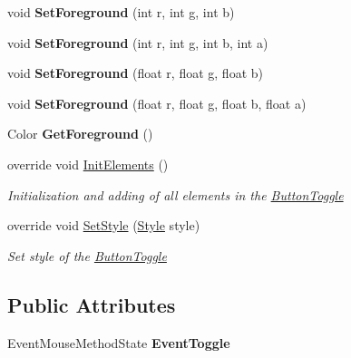 \begin{DoxyCompactItemize}
\mbox{\label{class_space_v_i_l_1_1_button_toggle_acbe7c5a48745ee961ec69cc8b9ed1fac}} 
void {\bfseries Set\+Foreground} (int r, int g, int b)
\item 
\mbox{\label{class_space_v_i_l_1_1_button_toggle_a734ebe430259a68d7a6ec1757d28e6de}} 
void {\bfseries Set\+Foreground} (int r, int g, int b, int a)
\item 
\mbox{\label{class_space_v_i_l_1_1_button_toggle_acddc6b624b12c5ea3cd2bb2970eda391}} 
void {\bfseries Set\+Foreground} (float r, float g, float b)
\item 
\mbox{\label{class_space_v_i_l_1_1_button_toggle_ab725dbd06795c980e9765c2a2d2ca1b3}} 
void {\bfseries Set\+Foreground} (float r, float g, float b, float a)
\item 
\mbox{\label{class_space_v_i_l_1_1_button_toggle_a5e2723658f35d5d0777d3dc082f5256e}} 
Color {\bfseries Get\+Foreground} ()
\item 
override void \mbox{\hyperlink{class_space_v_i_l_1_1_button_toggle_a5e2e938da7e38f0a6378fee26af5a75b}{Init\+Elements}} ()
\begin{DoxyCompactList}\small\item\em Initialization and adding of all elements in the \mbox{\hyperlink{class_space_v_i_l_1_1_button_toggle}{Button\+Toggle}} \end{DoxyCompactList}\item 
override void \mbox{\hyperlink{class_space_v_i_l_1_1_button_toggle_a8a6aed829ff23f94bc21734471f8edc9}{Set\+Style}} (\mbox{\hyperlink{class_space_v_i_l_1_1_decorations_1_1_style}{Style}} style)
\begin{DoxyCompactList}\small\item\em Set style of the \mbox{\hyperlink{class_space_v_i_l_1_1_button_toggle}{Button\+Toggle}} \end{DoxyCompactList}\end{DoxyCompactItemize}
\subsection*{Public Attributes}
\begin{DoxyCompactItemize}
\item 
\mbox{\label{class_space_v_i_l_1_1_button_toggle_a0c392efaeed75f29a9a75d2a36294b62}} 
Event\+Mouse\+Method\+State {\bfseries Event\+Toggle}
\end{DoxyCompactItemize}
